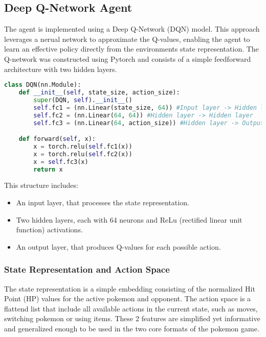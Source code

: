 \subsection{Deep Q-Network Agent}
The agent is implemented using a Deep Q-Network (DQN) model. This approach leverages
a nerual network to approximate the Q-values, enabling the agent to learn an 
effective policy directly from the environments state representation. 
The Q-network was constructed using Pytorch and consists of a simple feedforward
architecture with two hidden layers. 
\begin{lstlisting}[basicstyle=\fontsize{10}{10}\selectfont\ttfamily,language=Python,caption={The defined action space.},label=lst:action-space-def,breaklines]
class DQN(nn.Module):
    def __init__(self, state_size, action_size):
        super(DQN, self).__init__()
        self.fc1 = (nn.Linear(state_size, 64)) #Input layer -> Hidden layer
        self.fc2 = (nn.Linear(64, 64)) #Hidden layer -> Hidden layer
        self.fc3 = (nn.Linear(64, action_size)) #Hidden layer -> Output layer

    def forward(self, x):
        x = torch.relu(self.fc1(x))
        x = torch.relu(self.fc2(x))
        x = self.fc3(x)
        return x 
\end{lstlisting}
This structure includes:
\begin{itemize}
    \item An input layer, that processes the state representation.
    \item Two hidden layers, each with 64 neurons and ReLu (rectified linear unit function) activations.
    \item An output layer, that produces Q-values for each possible action.
\end{itemize}

\subsubsection{State Representation and Action Space}
The state representation is a simple embedding consisting of the normalized Hit Point (HP) values
for the active pokemon and opponent. The action space is a flattend list that
include all available actions in the current state, such as moves, switching pokemon
or using items. These 2 features are simplified yet informative and generalized 
enough to be used in the two core formats of the pokemon game.

